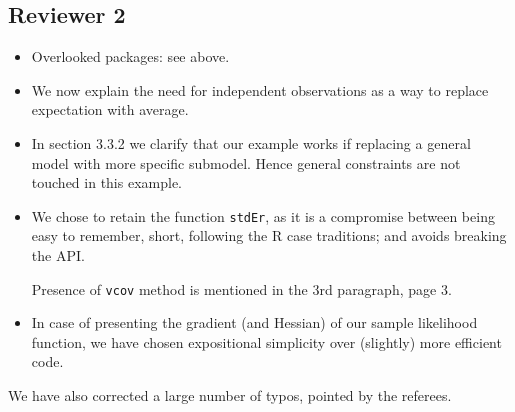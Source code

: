 \documentclass[a4paper]{article}
\begin{document}
\subsection*{Reviewer 2}

\begin{itemize}
\item Overlooked packages: see above.
\item We now explain the need for independent observations as a way to
  replace expectation with average.
\item In section 3.3.2 we clarify that our example works if replacing
  a general model with more specific submodel.  Hence general
  constraints are not touched in this example.
\item We chose to retain the function \texttt{stdEr}, as it is a
  compromise between being easy to remember, short, following the R
  case traditions; and avoids breaking the API.

  Presence of \texttt{vcov} method is mentioned in the 3rd paragraph,
  page 3.
\item In case of presenting the gradient (and Hessian) of our sample
  likelihood function, we have chosen expositional simplicity over
  (slightly) more efficient code.
\end{itemize}

We have also corrected a large number of typos, pointed by the referees.



\end{document}
